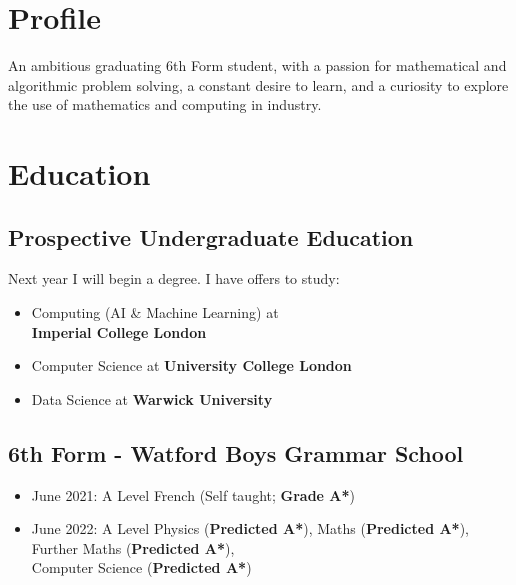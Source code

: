 \documentclass{Resume}
\begin{document}
\twocolumn[

\begin{@twocolumnfalse}

    \begin{center} \name{Hamish Starling} 

    \contact{hamishstarling@hotmail.co.uk}%
    
\end{center}



\end{@twocolumnfalse}
]

	\section{Profile}
    An ambitious graduating 6th Form student, with a passion for mathematical and algorithmic problem solving, a constant desire to learn, and a curiosity to explore the use of mathematics and computing in industry.


	\section{Education}
		\subsection{Prospective Undergraduate Education}
			Next year I will begin a degree. I have offers to study:
				\begin{itemize}
					\item Computing (AI \& Machine Learning) at \\ \textbf{Imperial College London}
					\item Computer Science at \textbf{University College London}
					\item Data Science at \textbf{Warwick University}
				\end{itemize}	

		\subsection{6th Form - Watford Boys Grammar School}
				\begin{itemize}
					\item June 2021: A Level French (Self taught; \textbf{Grade A*})
					\item June 2022: A Level Physics (\textbf{Predicted A*}), Maths (\textbf{Predicted A*}), Further Maths (\textbf{Predicted A*}), \\Computer Science (\textbf{Predicted A*})
				\end{itemize}
				
\end{document}
